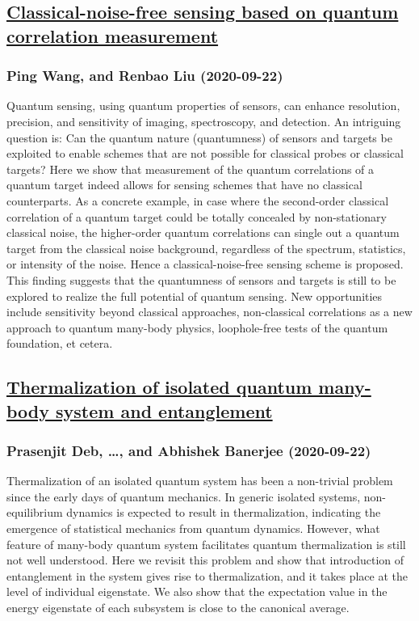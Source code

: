 {\subsection*{\href{http://arxiv.org/abs/2009.10429v2}{Classical-noise-free sensing based on quantum correlation measurement}}
\subsubsection*{Ping Wang, and Renbao Liu (2020-09-22)}
Quantum sensing, using quantum properties of sensors, can enhance resolution,
precision, and sensitivity of imaging, spectroscopy, and detection. An
intriguing question is: Can the quantum nature (quantumness) of sensors and
targets be exploited to enable schemes that are not possible for classical
probes or classical targets? Here we show that measurement of the quantum
correlations of a quantum target indeed allows for sensing schemes that have no
classical counterparts. As a concrete example, in case where the second-order
classical correlation of a quantum target could be totally concealed by
non-stationary classical noise, the higher-order quantum correlations can
single out a quantum target from the classical noise background, regardless of
the spectrum, statistics, or intensity of the noise. Hence a
classical-noise-free sensing scheme is proposed. This finding suggests that the
quantumness of sensors and targets is still to be explored to realize the full
potential of quantum sensing. New opportunities include sensitivity beyond
classical approaches, non-classical correlations as a new approach to quantum
many-body physics, loophole-free tests of the quantum foundation, et cetera.

\subsection*{\href{http://arxiv.org/abs/2009.10416v1}{Thermalization of isolated quantum many-body system and entanglement}}
\subsubsection*{Prasenjit Deb, \dots, and Abhishek Banerjee (2020-09-22)}
Thermalization of an isolated quantum system has been a non-trivial problem
since the early days of quantum mechanics. In generic isolated systems,
non-equilibrium dynamics is expected to result in thermalization, indicating
the emergence of statistical mechanics from quantum dynamics. However, what
feature of many-body quantum system facilitates quantum thermalization is still
not well understood. Here we revisit this problem and show that introduction of
entanglement in the system gives rise to thermalization, and it takes place at
the level of individual eigenstate. We also show that the expectation value in
the energy eigenstate of each subsystem is close to the canonical average.

}
